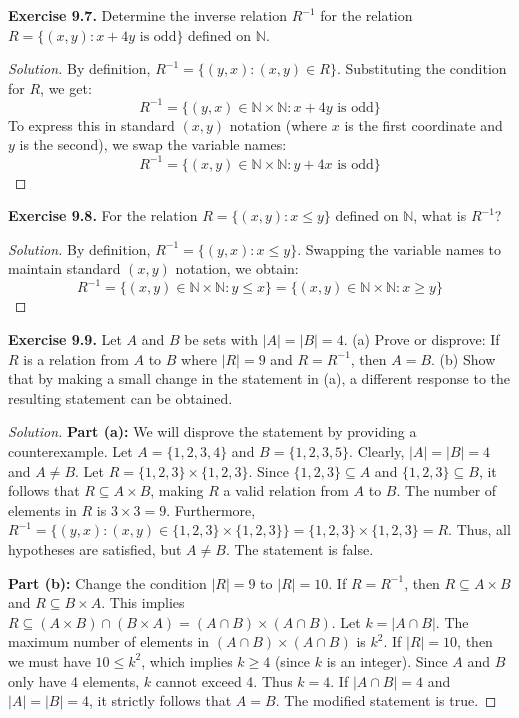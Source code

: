 \documentclass[11pt, a4paper]{article}
\theoremstyle{definition}
\theoremstyle{remark}
\newcommand{\N}{\mathbb{N}}
\begin{document}
\vspace{1em}
\textbf{Exercise 9.7.} Determine the inverse relation $R^{-1}$ for the relation $R = \{(x, y) : x + 4y \text{ is odd}\}$ defined on $\N$.
\begin{proof}[Solution]
By definition, $R^{-1} = \{ (y, x) : (x, y) \in R \}$. 
Substituting the condition for $R$, we get:
\[ R^{-1} = \{ (y, x) \in \N \times \N : x + 4y \text{ is odd} \} \]
To express this in standard $(x, y)$ notation (where $x$ is the first coordinate and $y$ is the second), we swap the variable names:
\[ R^{-1} = \{ (x, y) \in \N \times \N : y + 4x \text{ is odd} \} \]
\end{proof}

\vspace{1em}
\textbf{Exercise 9.8.} For the relation $R = \{(x, y) : x \le y\}$ defined on $\N$, what is $R^{-1}$?
\begin{proof}[Solution]
By definition, $R^{-1} = \{ (y, x) : x \le y \}$. 
Swapping the variable names to maintain standard $(x, y)$ notation, we obtain:
\[ R^{-1} = \{ (x, y) \in \N \times \N : y \le x \} = \{ (x, y) \in \N \times \N : x \ge y \} \]
\end{proof}

\vspace{1em}
\textbf{Exercise 9.9.} Let $A$ and $B$ be sets with $|A| = |B| = 4$.
(a) Prove or disprove: If $R$ is a relation from $A$ to $B$ where $|R| = 9$ and $R = R^{-1}$, then $A = B$.
(b) Show that by making a small change in the statement in (a), a different response to the resulting statement can be obtained.
\begin{proof}[Solution]
\textbf{Part (a):} We will disprove the statement by providing a counterexample. 
Let $A = \{1, 2, 3, 4\}$ and $B = \{1, 2, 3, 5\}$. Clearly, $|A| = |B| = 4$ and $A \neq B$.
Let $R = \{1, 2, 3\} \times \{1, 2, 3\}$. 
Since $\{1, 2, 3\} \subseteq A$ and $\{1, 2, 3\} \subseteq B$, it follows that $R \subseteq A \times B$, making $R$ a valid relation from $A$ to $B$.
The number of elements in $R$ is $3 \times 3 = 9$.
Furthermore, $R^{-1} = \{ (y, x) : (x, y) \in \{1, 2, 3\} \times \{1, 2, 3\} \} = \{1, 2, 3\} \times \{1, 2, 3\} = R$.
Thus, all hypotheses are satisfied, but $A \neq B$. The statement is false.

\textbf{Part (b):} Change the condition $|R| = 9$ to $|R| = 10$. 
If $R = R^{-1}$, then $R \subseteq A \times B$ and $R \subseteq B \times A$. This implies $R \subseteq (A \times B) \cap (B \times A) = (A \cap B) \times (A \cap B)$.
Let $k = |A \cap B|$. The maximum number of elements in $(A \cap B) \times (A \cap B)$ is $k^2$.
If $|R| = 10$, then we must have $10 \le k^2$, which implies $k \ge 4$ (since $k$ is an integer).
Since $A$ and $B$ only have 4 elements, $k$ cannot exceed 4. Thus $k = 4$.
If $|A \cap B| = 4$ and $|A| = |B| = 4$, it strictly follows that $A = B$. The modified statement is true.
\end{proof}
\end{document}
